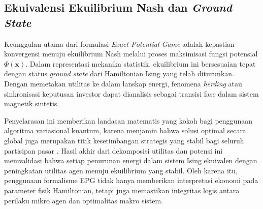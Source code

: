 \subsection{Ekuivalensi Ekuilibrium Nash dan \textit{Ground State}}

Keunggulan utama dari formulasi \textit{Exact Potential Game} adalah kepastian konvergensi menuju ekuilibrium Nash melalui proses maksimisasi fungsi potensial $\Phi(\mathbf{x})$. Dalam representasi mekanika statistik, ekuilibrium ini bersesuaian tepat dengan status \textit{ground state} dari Hamiltonian Ising yang telah diturunkan. Dengan memetakan utilitas ke dalam lanskap energi, fenomena \textit{herding} atau sinkronisasi keputusan investor dapat dianalisis sebagai transisi fase dalam sistem magnetik sintetis.

Penyelarasan ini memberikan landasan matematis yang kokoh bagi penggunaan algoritma variasional kuantum, karena menjamin bahwa solusi optimal secara global juga merupakan titik kesetimbangan strategis yang stabil bagi seluruh partisipan pasar \cite{menezes_ex_2025}. Hasil akhir dari dekomposisi utilitas dan potensi ini memvalidasi bahwa setiap penurunan energi dalam sistem Ising ekuivalen dengan peningkatan utilitas agen menuju ekuilibrium yang stabil. Oleh karena itu, penggunaan formalisme EPG tidak hanya memberikan interpretasi ekonomi pada parameter fisik Hamiltonian, tetapi juga memastikan integritas logis antara perilaku mikro agen dan optimalitas makro sistem.